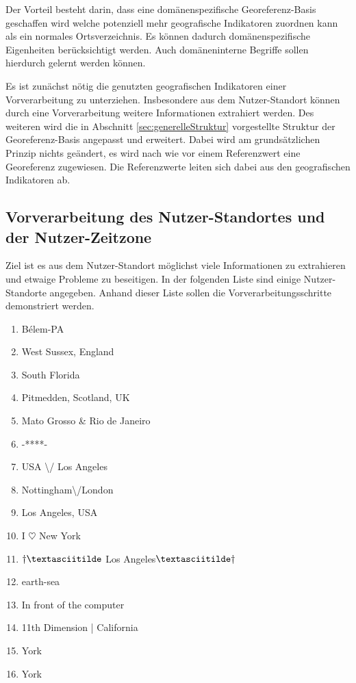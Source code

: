 		Der Vorteil besteht darin, dass eine domänenspezifische Georeferenz-Basis geschaffen wird welche potenziell mehr geografische Indikatoren zuordnen kann als ein normales Ortsverzeichnis.
		Es können dadurch domänenspezifische Eigenheiten berücksichtigt werden. 
		Auch domäneninterne Begriffe sollen hierdurch gelernt werden können. 

		Es ist zunächst nötig die genutzten geografischen Indikatoren einer Vorverarbeitung zu unterziehen. 
		Insbesondere aus dem Nutzer-Standort können durch eine Vorverarbeitung weitere Informationen extrahiert werden.
		Des weiteren wird die in Abschnitt \ref{sec:generelleStruktur} vorgestellte Struktur der Georeferenz-Basis angepasst und erweitert. 
		Dabei wird am grundsätzlichen Prinzip nichts geändert, es wird nach wie vor einem Referenzwert eine Georeferenz zugewiesen.
		Die Referenzwerte leiten sich dabei aus den geografischen Indikatoren ab. 

		\subsection{Vorverarbeitung des Nutzer-Standortes und der Nutzer-Zeitzone} \label{subsec:VorverarbeitungStandortZeitzone} 
			
			Ziel ist es aus dem Nutzer-Standort möglichst viele Informationen zu extrahieren und etwaige Probleme zu beseitigen.
			In der folgenden Liste sind einige Nutzer-Standorte angegeben. 
			Anhand dieser Liste sollen die Vorverarbeitungsschritte demonstriert werden.

			\begin{multicols}{2}
			\begin{enumerate}
				\item Bélem-PA
				\item West Sussex, England
				\item South Florida
				\item Pitmedden,  Scotland, UK
				\item Mato Grosso \& Rio de Janeiro
				\item -****-
				\item USA \textbackslash/ Los Angeles
				\item Nottingham\textbackslash/London
				\item Los Angeles, USA
				\item I $\heartsuit$ New York 
				\item $\dagger\textasciitilde$ Los Angeles$\textasciitilde\dagger$
				\item earth-sea
				\item In front of the computer
				\item 11th Dimension | California
				\item York
				\item York
			\end{enumerate}
			\end{multicols}
				

